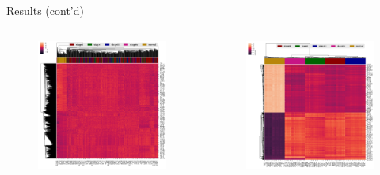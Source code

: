 \documentclass{beamer}
\begin{document}
\begin{frame}{Results (cont'd)}
	\begin{columns}
		\begin{column}{.48\textwidth}
			\begin{figure}[ht]
				\centering
				\includegraphics[width=1\textwidth]{figures/original-data-heatmap.png}
				\caption*{\label{fig:original-heatmap}}
			\end{figure}
		\end{column}
		\begin{column}{.48\textwidth}
			\begin{figure}[ht]
				\centering
				\includegraphics[width=1\textwidth]{figures/data-aug.png}

\end{figure}
\end{column}
\end{columns}
\end{frame}
\end{document}
